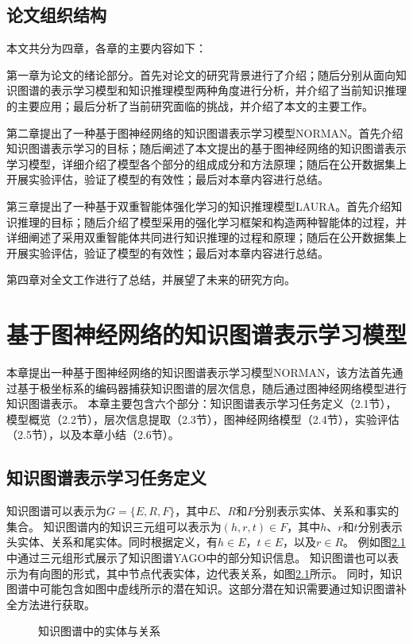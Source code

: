 \documentclass[algorithmlist, AutoFakeBold, AutoFakeSlant, figurelist, tablelist, nomlist, engineering]{seuthesix}
\begin{document}
\section{论文组织结构}
本文共分为四章，各章的主要内容如下：

第一章为论文的绪论部分。首先对论文的研究背景进行了介绍；随后分别从面向知识图谱的表示学习模型和知识推理模型两种角度进行分析，并介绍了当前知识推理的主要应用；最后分析了当前研究面临的挑战，并介绍了本文的主要工作。

第二章提出了一种基于图神经网络的知识图谱表示学习模型NORMAN。首先介绍知识图谱表示学习的目标；随后阐述了本文提出的基于图神经网络的知识图谱表示学习模型，详细介绍了模型各个部分的组成成分和方法原理；随后在公开数据集上开展实验评估，验证了模型的有效性；最后对本章内容进行总结。

第三章提出了一种基于双重智能体强化学习的知识推理模型LAURA。首先介绍知识推理的目标；随后介绍了模型采用的强化学习框架和构造两种智能体的过程，并详细阐述了采用双重智能体共同进行知识推理的过程和原理；随后在公开数据集上开展实验评估，验证了模型的有效性；最后对本章内容进行总结。

第四章对全文工作进行了总结，并展望了未来的研究方向。


\chapter{基于图神经网络的知识图谱表示学习模型}
本章提出一种基于图神经网络的知识图谱表示学习模型NORMAN，该方法首先通过基于极坐标系的编码器捕获知识图谱的层次信息，随后通过图神经网络模型进行知识图谱表示。
本章主要包含六个部分：知识图谱表示学习任务定义（2.1节），模型概览（2.2节），层次信息提取（2.3节），图神经网络模型（2.4节），实验评估（2.5节），以及本章小结（2.6节）。

\section{知识图谱表示学习任务定义}
知识图谱可以表示为$G=\{E, R, F\}$，其中$E$、$R$和$F$分别表示实体、关系和事实的集合。
知识图谱内的知识三元组可以表示为$(h, r, t) \in F$，其中$h$、$r$和$t$分别表示头实体、关系和尾实体。同时根据定义，有$h \in E$，$t \in E$，以及$r \in R$。
例如图\ref{2_KG}中通过三元组形式展示了知识图谱YAGO中的部分知识信息。
知识图谱也可以表示为有向图的形式，其中节点代表实体，边代表关系，如图\ref{2_KG}所示。
同时，知识图谱中可能包含如图中虚线所示的潜在知识。这部分潜在知识需要通过知识图谱补全方法进行获取。
\begin{figure}[H]
  \centering
  \caption{知识图谱中的实体与关系}
  \label{2_KG}
\end{figure}
\end{document}
